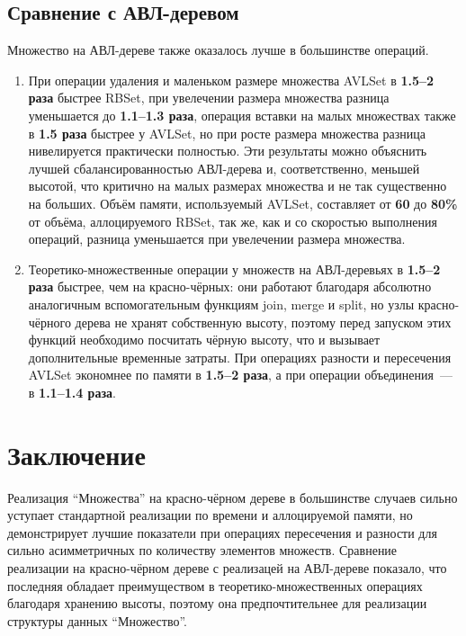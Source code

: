 \documentclass[a4paper]{article}
\begin{document}
\subsection{Сравнение с АВЛ-деревом}
Множество на АВЛ-дереве также оказалось лучше в большинстве операций.
\begin{enumerate}
    \item При операции удаления и маленьком размере множества AVLSet в \textbf{1.5--2 раза} быстрее RBSet, при увелечении размера множества 
    разница уменьшается до \textbf{1.1--1.3 раза}, операция вставки на малых множествах также в \textbf{1.5 раза} быстрее у AVLSet, но при росте 
    размера множества разница нивелируется практически полностью. Эти результаты можно объяснить лучшей сбалансированностью АВЛ-дерева и, соответственно,
    меньшей высотой, что критично на малых размерах множества и не так существенно на больших.
    Объём памяти, используемый AVLSet, составляет от \textbf{60} до \textbf{80\%}  от объёма, аллоцируемого RBSet, так же, как и со
    скоростью выполнения операций, разница уменьшается при увелечении размера множества.
    \item Теоретико-множественные операции у множеств на АВЛ-деревьях в \textbf{1.5--2 раза} быстрее, чем на красно-чёрных: они работают благодаря абсолютно 
    аналогичным вспомогательным функциям join, merge и split, но узлы красно-чёрного дерева не хранят собственную высоту, поэтому перед запуском этих 
    функций необходимо посчитать чёрную высоту, что и вызывает дополнительные временные затраты.
    При операциях разности и пересечения AVLSet экономнее по памяти в \textbf{1.5--2 раза}, а при операции объединения~--- в \textbf{1.1--1.4 раза}.
\end{enumerate}

\section{Заключение}

Реализация \enquote{Множества} на красно-чёрном дереве в большинстве случаев сильно уступает стандартной реализации по времени и аллоцируемой памяти, 
но демонстрирует лучшие показатели при операциях пересечения и разности для сильно асимметричных по количеству элементов множеств.
Сравнение реализации на красно-чёрном дереве с реализацей на АВЛ-дереве показало, что последняя обладает преимуществом в теоретико-множественных операциях благодаря 
хранению высоты, поэтому она предпочтительнее для реализации структуры данных \enquote{Множество}. 
\end{document}
